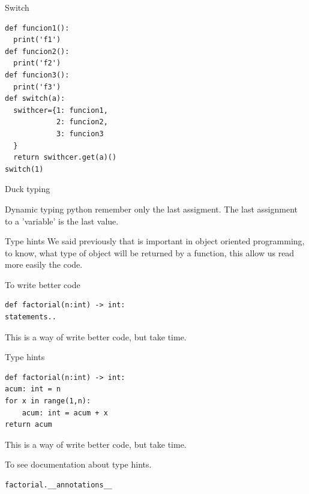 \documentclass{beamer}
\begin{document}
\begin{frame}[fragile]{Switch}
\begin{lstlisting}
def funcion1():
  print('f1')
def funcion2():
  print('f2')
def funcion3():
  print('f3')
def switch(a):
  swithcer={1: funcion1, 
            2: funcion2,
            3: funcion3
  }
  return swithcer.get(a)()
switch(1)
\end{lstlisting}

\end{frame}



\begin{frame}{Duck typing}


\end{frame}



\begin{frame}{Dynamic typing}
python remember only the last assigment.
The last assignment to a 'variable' is the last value.

\end{frame}

\begin{frame}[fragile]{Type hints}
We said previously that is important in object oriented programming, to know, what type of object will be returned by a function, this allow us read more easily the code.

To write better code
\begin{lstlisting}
def factorial(n:int) -> int:
statements..
\end{lstlisting}
This is a way of write better code, but take time.
\end{frame}



\begin{frame}[fragile]{Type hints}

\begin{lstlisting}
def factorial(n:int) -> int:
acum: int = n 
for x in range(1,n):
	acum: int = acum + x
return acum

\end{lstlisting}
This is a way of write better code, but take time.
\end{frame}


\begin{frame}[fragile]
To see documentation about type hints.
\begin{lstlisting}
factorial.__annotations__
\end{lstlisting}
\end{frame}
\end{document}
